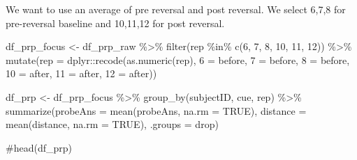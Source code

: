 \documentclass[
  letterpaper,
  DIV=11,
  numbers=noendperiod]{scrartcl}
\newenvironment{Shaded}{\begin{snugshade}}{\end{snugshade}}
\newcommand{\AttributeTok}[1]{\textcolor[rgb]{0.40,0.45,0.13}{#1}}
\newcommand{\CommentTok}[1]{\textcolor[rgb]{0.37,0.37,0.37}{#1}}
\newcommand{\ConstantTok}[1]{\textcolor[rgb]{0.56,0.35,0.01}{#1}}
\newcommand{\DecValTok}[1]{\textcolor[rgb]{0.68,0.00,0.00}{#1}}
\newcommand{\FunctionTok}[1]{\textcolor[rgb]{0.28,0.35,0.67}{#1}}
\newcommand{\NormalTok}[1]{\textcolor[rgb]{0.00,0.23,0.31}{#1}}
\newcommand{\OtherTok}[1]{\textcolor[rgb]{0.00,0.23,0.31}{#1}}
\newcommand{\SpecialCharTok}[1]{\textcolor[rgb]{0.37,0.37,0.37}{#1}}
\newcommand{\StringTok}[1]{\textcolor[rgb]{0.13,0.47,0.30}{#1}}
\begin{document}
We want to use an average of pre reversal and post reversal. We select
6,7,8 for pre-reversal baseline and 10,11,12 for post reversal.

\begin{Shaded}
\begin{Highlighting}[]
\NormalTok{df\_prp\_focus }\OtherTok{\textless{}{-}}\NormalTok{ df\_prp\_raw }\SpecialCharTok{\%\textgreater{}\%}
  \FunctionTok{filter}\NormalTok{(rep }\SpecialCharTok{\%in\%} \FunctionTok{c}\NormalTok{(}\DecValTok{6}\NormalTok{, }\DecValTok{7}\NormalTok{, }\DecValTok{8}\NormalTok{, }\DecValTok{10}\NormalTok{, }\DecValTok{11}\NormalTok{, }\DecValTok{12}\NormalTok{)) }\SpecialCharTok{\%\textgreater{}\%}
  \FunctionTok{mutate}\NormalTok{(}\AttributeTok{rep =}\NormalTok{ dplyr}\SpecialCharTok{::}\FunctionTok{recode}\NormalTok{(}\FunctionTok{as.numeric}\NormalTok{(rep),}
                      \StringTok{\textasciigrave{}}\AttributeTok{6}\StringTok{\textasciigrave{}} \OtherTok{=} \StringTok{\textquotesingle{}before\textquotesingle{}}\NormalTok{, }\StringTok{\textasciigrave{}}\AttributeTok{7}\StringTok{\textasciigrave{}} \OtherTok{=} \StringTok{\textquotesingle{}before\textquotesingle{}}\NormalTok{, }\StringTok{\textasciigrave{}}\AttributeTok{8}\StringTok{\textasciigrave{}} \OtherTok{=} \StringTok{\textquotesingle{}before\textquotesingle{}}\NormalTok{,}
                      \StringTok{\textasciigrave{}}\AttributeTok{10}\StringTok{\textasciigrave{}} \OtherTok{=} \StringTok{\textquotesingle{}after\textquotesingle{}}\NormalTok{, }\StringTok{\textasciigrave{}}\AttributeTok{11}\StringTok{\textasciigrave{}} \OtherTok{=} \StringTok{\textquotesingle{}after\textquotesingle{}}\NormalTok{, }\StringTok{\textasciigrave{}}\AttributeTok{12}\StringTok{\textasciigrave{}} \OtherTok{=} \StringTok{\textquotesingle{}after\textquotesingle{}}\NormalTok{))}

\NormalTok{df\_prp }\OtherTok{\textless{}{-}}\NormalTok{ df\_prp\_focus }\SpecialCharTok{\%\textgreater{}\%}
  \FunctionTok{group\_by}\NormalTok{(subjectID, cue, rep) }\SpecialCharTok{\%\textgreater{}\%}
  \FunctionTok{summarize}\NormalTok{(}\AttributeTok{probeAns =} \FunctionTok{mean}\NormalTok{(probeAns, }\AttributeTok{na.rm =} \ConstantTok{TRUE}\NormalTok{),}
            \AttributeTok{distance =} \FunctionTok{mean}\NormalTok{(distance, }\AttributeTok{na.rm =} \ConstantTok{TRUE}\NormalTok{), }\AttributeTok{.groups =} \StringTok{\textquotesingle{}drop\textquotesingle{}}\NormalTok{)}

\CommentTok{\#head(df\_prp)}
\end{Highlighting}
\end{Shaded}
\end{document}
